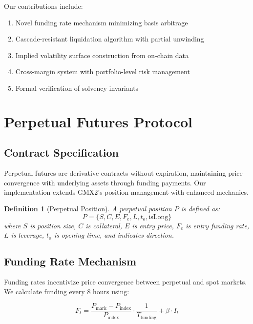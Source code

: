 \documentclass[11pt,a4paper]{article}
\newtheorem{definition}[theorem]{Definition}
\begin{document}
Our contributions include:
\begin{enumerate}
    \item Novel funding rate mechanism minimizing basis arbitrage
    \item Cascade-resistant liquidation algorithm with partial unwinding
    \item Implied volatility surface construction from on-chain data
    \item Cross-margin system with portfolio-level risk management
    \item Formal verification of solvency invariants
\end{enumerate}

\section{Perpetual Futures Protocol}

\subsection{Contract Specification}

Perpetual futures are derivative contracts without expiration, maintaining price convergence with underlying assets through funding payments. Our implementation extends GMX2's position management with enhanced mechanics.

\begin{definition}[Perpetual Position]
A perpetual position $P$ is defined as:
\begin{equation}
P = \{S, C, E, F_e, L, t_o, \text{isLong}\}
\end{equation}
where $S$ is position size, $C$ is collateral, $E$ is entry price, $F_e$ is entry funding rate, $L$ is leverage, $t_o$ is opening time, and  indicates direction.
\end{definition}

\subsection{Funding Rate Mechanism}

Funding rates incentivize price convergence between perpetual and spot markets. We calculate funding every 8 hours using:

\begin{equation}
F_t = \frac{P_{\text{mark}} - P_{\text{index}}}{P_{\text{index}}} \cdot \frac{1}{T_{\text{funding}}} + \beta \cdot I_t
\end{equation}
\end{document}
